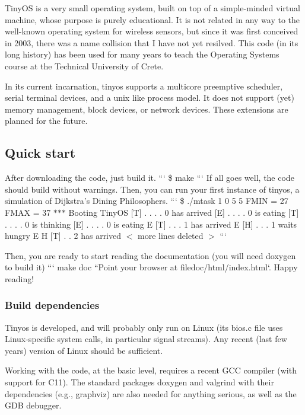 Tiny\-O\-S is a very small operating system, built on top of a simple-\/minded virtual machine, whose purpose is purely educational. It is not related in any way to the well-\/known operating system for wireless sensors, but since it was first conceived in 2003, there was a name collision that I have not yet resilved. This code (in its long history) has been used for many years to teach the Operating Systems course at the Technical University of Crete.

In its current incarnation, tinyos supports a multicore preemptive scheduler, serial terminal devices, and a unix like process model. It does not support (yet) memory management, block devices, or network devices. These extensions are planned for the future.

\subsection*{Quick start}

After downloading the code, just build it. ``` \$ make ``` If all goes well, the code should build without warnings. Then, you can run your first instance of tinyos, a simulation of Dijkstra's Dining Philosophers. ``` \$ ./mtask 1 0 5 5 F\-M\-I\-N = 27 F\-M\-A\-X = 37 $\ast$$\ast$$\ast$ Booting Tiny\-O\-S \mbox{[}T\mbox{]} . . . . 0 has arrived \mbox{[}E\mbox{]} . . . . 0 is eating \mbox{[}T\mbox{]} . . . . 0 is thinking \mbox{[}E\mbox{]} . . . . 0 is eating E \mbox{[}T\mbox{]} . . . 1 has arrived E \mbox{[}H\mbox{]} . . . 1 waits hungry E H \mbox{[}T\mbox{]} . . 2 has arrived $<$ more lines deleted $>$ ```

Then, you are ready to start reading the documentation (you will need {\ttfamily doxygen} to build it) ``` make doc ``{\ttfamily  Point your browser at file}doc/html/index.\-html`. Happy reading!

\subsubsection*{Build dependencies}

Tinyos is developed, and will probably only run on Linux (its bios.\-c file uses Linux-\/specific system calls, in particular signal streams). Any recent (last few years) version of Linux should be sufficient.

Working with the code, at the basic level, requires a recent G\-C\-C compiler (with support for C11). The standard packages {\ttfamily doxygen} and {\ttfamily valgrind} with their dependencies (e.\-g., {\ttfamily graphviz}) are also needed for anything serious, as well as the G\-D\-B debugger. 